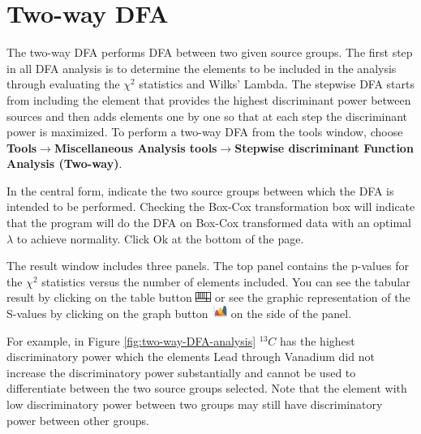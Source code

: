 \documentclass[12pt]{report}
\begin{document}
\section{Two-way DFA}
The two-way DFA performs DFA between two given source groups. The first step in all DFA analysis is to determine the elements to be included in the analysis through evaluating the $\chi^2$ statistics and Wilks' Lambda. The stepwise DFA starts from including the element that provides the highest discriminant power between sources and then adds elements one by one so that at each step the discriminant power is maximized. To perform a two-way DFA from the tools window, choose \textbf{Tools}$\rightarrow$\textbf{Miscellaneous Analysis tools}$\rightarrow$\textbf{Stepwise discriminant Function Analysis (Two-way)}. 

In the central form, indicate the two source groups between which the DFA is intended to be performed. Checking the Box-Cox transformation box will indicate that the program will do the DFA on Box-Cox transformed data with an optimal $\lambda$ to achieve normality. Click Ok at the bottom of the page. 

The result window includes three panels. The top panel contains the p-values for the $\chi^2$ statistics versus the number of elements included. You can see the tabular result by clicking on the table button \includegraphics[width=0.5cm]{Figures/table.png} or see the graphic representation of the S-values by clicking on the graph button \includegraphics[width=0.5cm]{Figures/Graph.png} on the side of the panel. 

For example, in Figure \ref{fig:two-way-DFA-analysis} $^{13}C$ has the highest discriminatory power which the elements Lead through Vanadium did not increase the discriminatory power substantially and cannot be used to differentiate between the two source groups selected. Note that the element with low discriminatory power between two groups may still have discriminatory power between other groups. 
\end{document}
